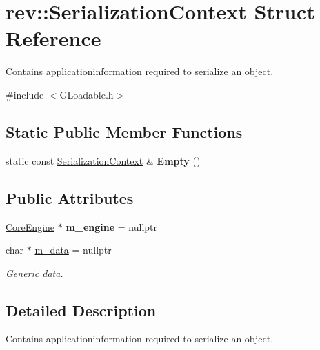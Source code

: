 \hypertarget{structrev_1_1_serialization_context}{}\section{rev\+::Serialization\+Context Struct Reference}
\label{structrev_1_1_serialization_context}


Contains applicationinformation required to serialize an object.  




{\ttfamily \#include $<$G\+Loadable.\+h$>$}

\subsection*{Static Public Member Functions}
\begin{DoxyCompactItemize}
\item 
\mbox{\label{structrev_1_1_serialization_context_a4e375fce46fb795e65efb7d570571658}} 
static const \mbox{\hyperlink{structrev_1_1_serialization_context}{Serialization\+Context}} \& {\bfseries Empty} ()
\end{DoxyCompactItemize}
\subsection*{Public Attributes}
\begin{DoxyCompactItemize}
\item 
\mbox{\label{structrev_1_1_serialization_context_acc11c87d7224b165fdc030d743980c9f}} 
\mbox{\hyperlink{classrev_1_1_core_engine}{Core\+Engine}} $\ast$ {\bfseries m\+\_\+engine} = nullptr
\item 
\mbox{\label{structrev_1_1_serialization_context_ad41d1ff481cae616b929d670397b508d}} 
char $\ast$ \mbox{\hyperlink{structrev_1_1_serialization_context_ad41d1ff481cae616b929d670397b508d}{m\+\_\+data}} = nullptr
\begin{DoxyCompactList}\small\item\em Generic data. \end{DoxyCompactList}\end{DoxyCompactItemize}


\subsection{Detailed Description}
Contains applicationinformation required to serialize an object. 

